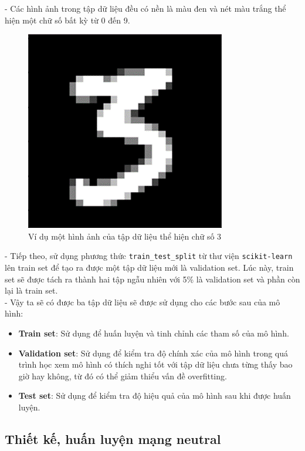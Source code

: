 - Các hình ảnh trong tập dữ liệu đều có nền là màu đen và nét màu trắng thể hiện một chữ số bất kỳ từ 0 đến 9.\\
\begin{figure}
    \centering
    \includegraphics[width=0.4\linewidth]{img/data_sample.png}
    \caption{Ví dụ một hình ảnh của tập dữ liệu thể hiện chữ số 3}
\end{figure}

- Tiếp theo, sử dụng phương thức \texttt{train\_test\_split} từ thư viện \texttt{scikit-learn} lên train set để tạo ra được một tập dữ liệu mới là validation set. Lúc này, train set sẽ được tách ra thành hai tập ngẫu nhiên với 5\% là validation set và phần còn lại là train set.
\\- Vậy ta sẽ có được ba tập dữ liệu sẽ được sử dụng cho các bước sau của mô hình:
\begin{itemize}
    \item \textbf{Train set}:  Sử dụng để huấn luyện và tinh chỉnh các tham số của mô hình.
    \item \textbf{Validation set}: Sử dụng để kiểm tra độ chính xác của mô hình trong quá trình học xem mô hình có thích nghi tốt với tập dữ liệu chưa từng thấy bao giờ hay không, từ đó có thể giảm thiểu vấn đề overfitting.

    \item \textbf{Test set}: Sử dụng để kiểm tra độ hiệu quả của mô hình sau khi được huấn luyện.
\end{itemize}

\subsection{Thiết kế, huấn luyện mạng neutral}

